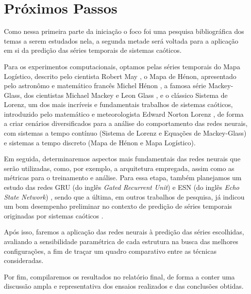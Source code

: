 \documentclass[a4paper, 12pt]{article}
\begin{document}
\section{Próximos Passos}

Como nessa primeira parte da iniciação o foco foi uma pesquisa bibliográfica dos temas a serem estudados nela, a segunda metade será voltada para a aplicação em si da predição das séries temporais de sistemas caóticos.

Para os experimentos computacionais, optamos pelas séries temporais do Mapa Logístico, descrito pelo cientista Robert May \cite{may1976simple}, o Mapa de Hénon, apresentado pelo astronômo e matemático francês Michel Hénon \cite{henon1976two}, a famosa série Mackey-Glass, dos cientistas Michael Mackey e Leon Glass \cite{mackey1977oscillation}, e o clássico Sistema de Lorenz, um dos  mais incríveis e fundamentais trabalhos de sistemas caóticos, introduzido pelo matemático e meteorologista Edward Norton Lorenz \cite{lorenz1963deterministic}, de forma a criar cenários diversificados para a análise do comportamento das redes neurais, com sistemas a tempo contínuo (Sistema de Lorenz e Equações de Mackey-Glass) e sistemas a tempo discreto (Mapa de Hénon e Mapa Logístico).

Em seguida, determinaremos aspectos mais fundamentais das redes neurais que serão utilizadas, como, por exemplo, a arquitetura empregada, assim como as métricas para o treinamento e análise. Para essa etapa, também planejamos um estudo das redes GRU (do inglês \textit{Gated Recurrent Unit}) \cite{cho2014learning} e ESN (do inglês \textit{Echo State Network}) \cite{jaeger2007echo}, sendo que a última, em outros trabalhos de pesquisa, já indicou um bom desempenho preliminar no contexto de predição de séries temporais originadas por sistemas caóticos \cite{boccato2013novas}.

Após isso, faremos a aplicação das redes neurais à predição das séries escolhidas, avaliando a sensibilidade paramétrica de cada estrutura na busca das melhores configurações, a fim de traçar um quadro comparativo entre as técnicas consideradas. 

Por fim, compilaremos os resultados no relatório final, de forma a conter uma discussão ampla e representativa dos ensaios realizados e das conclusões obtidas. 




\end{document}
